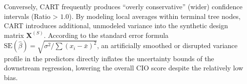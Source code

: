 Conversely, CART frequently produces ``overly conservative'' (wider) confidence intervals (Ratio > $1.0$). By modeling local averages within terminal tree nodes, CART introduces additional, unmodeled variance into the synthetic design matrix $\mathbf{X}^{(S)}$. According to the standard error formula $\text{SE}(\hat{\beta}) = \sqrt{\sigma^2 / \sum(x_i - \bar{x})^2}$, an artificially smoothed or disrupted variance profile in the predictors directly inflates the uncertainty bounds of the downstream regression, lowering the overall CIO score despite the relatively low bias.
